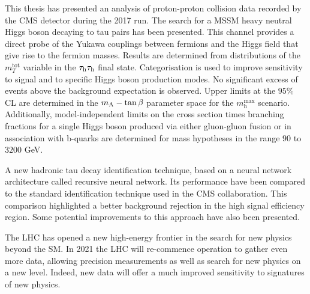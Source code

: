 This thesis has presented an analysis of proton-proton collision data recorded by the CMS detector during  the 2017 run. The search for a MSSM heavy neutral Higgs boson decaying to tau pairs has been presented. This channel provides a direct probe of the Yukawa couplings between fermions and the Higgs field that give rise to the fermion masses. Results are determined from distributions of the $m_{T}^{\mathrm{tot}}$ variable in the $\tau_{\rm h}\tau_{\rm h}$ final state. Categorisation is used to improve sensitivity to signal and to specific Higgs boson production modes. No significant excess of events above the background expectation is observed. Upper limits at the $95\%$ CL are determined in the $m_{\mathrm{A}}-\mathrm{tan}\,\beta$ parameter space for the $m_{\mathrm{h}}^{\mathrm{max}}$ scenario. Additionally, model-independent limits on the cross section times branching fractions for a single Higgs boson produced via either gluon-gluon fusion or in association with b-quarks are determined for mass hypotheses in the range $90$ to $3200$ GeV.

A new hadronic tau decay identification technique, based on a neural network architecture called recursive neural network. Its performance have been compared to the standard identification technique used in the CMS collaboration. This comparison highlighted a better background rejection in the high signal efficiency region. Some potential improvements to this approach have also been presented.

The LHC has opened a new high-energy frontier in the search for new physics beyond the SM. In 2021 the LHC will re-commence operation to gather even more data, allowing precision measurements as well as search for new physics on a new level. Indeed, new data will offer a much improved sensitivity to signatures of new physics.